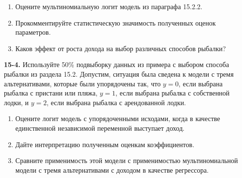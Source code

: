\begin{enumerate}
\item  Оцените мультиномиальную логит модель из параграфа 15.2.2.

\item  Прокомментируйте статистическую значимость полученных оценок параметров.

\item  Каков эффект от роста дохода на выбор различных способов рыбалки?
\end{enumerate}

\textbf{15-4. }Используйте 50\% подвыборку данных из примера с выбором способа рыбалки из раздела 15.2. Допустим, ситуация была сведена к модели с тремя альтернативами, которые были упорядочены так, что $y=0$, если выбрана рыбалка с пристани или пляжа, $y=1$, если выбрана рыбалка с собственной лодки, и $y=2$, если выбрана рыбалка с арендованной лодки.

\begin{enumerate}
\item  Оцените логит модель с упорядоченными исходами, когда в качестве единственной независимой переменной выступает доход.

\item  Дайте интерпретацию полученным оценкам коэффициентов.

\item  Сравните применимость этой модели с применимостью мультиномиальной модели с тремя альтернативами с доходом в качестве регрессора.
\end{enumerate}



